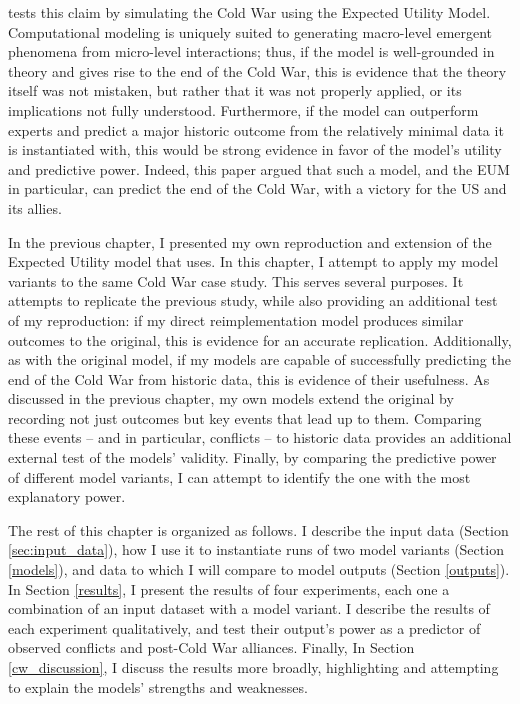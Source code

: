 \citet{bdm_1998} tests this claim by simulating the Cold War using the Expected Utility Model. Computational modeling is uniquely suited to generating macro-level emergent phenomena from micro-level interactions; thus, if the model is well-grounded in theory and gives rise to the end of the Cold War, this is evidence that the theory itself was not mistaken, but rather that it was not properly applied, or its implications not fully understood. Furthermore, if the model can outperform experts and predict a major historic outcome from the relatively minimal data it is instantiated with, this would be strong evidence in favor of the model's utility and predictive power. Indeed, this paper argued that such a model, and the EUM in particular, can predict the end of the Cold War, with a victory for the US and its allies.

In the previous chapter, I presented my own reproduction and extension of the Expected Utility model that \citet{bdm_1998} uses. In this chapter, I attempt to apply my model variants to the same Cold War case study. This serves several purposes. It attempts to replicate the previous study, while also providing an additional test of my reproduction: if my direct reimplementation model produces similar outcomes to the original, this is evidence for an accurate replication. Additionally, as with the original model, if my models are capable of successfully predicting the end of the Cold War from historic data, this is evidence of their usefulness. As discussed in the previous chapter, my own models extend the original by recording not just outcomes but key events that lead up to them. Comparing these events -- and in particular, conflicts -- to historic data provides an additional external test of the models' validity. Finally, by comparing the predictive power of different model variants, I can attempt to identify the one with the most explanatory power.

The rest of this chapter is organized as follows. I describe the input data (Section \ref{sec:input_data}), how I use it to instantiate runs of two model variants (Section \ref{models}), and data to which I will compare to model outputs (Section \ref{outputs}). In Section \ref{results}, I present the results of four experiments, each one a combination of an input dataset with a model variant. I describe the results of each experiment qualitatively, and test their output's power as a predictor of observed conflicts and post-Cold War alliances. Finally, In Section \ref{cw_discussion}, I discuss the results more broadly, highlighting and attempting to explain the models' strengths and weaknesses.

